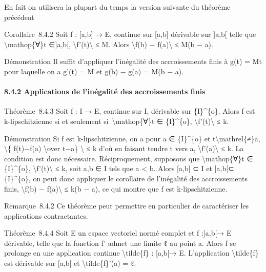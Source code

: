 \documentclass[]{article}
\begin{document}
En fait on utilisera la plupart du temps la version suivante du théorème
précédent

Corollaire~8.4.2 Soit f : {[}a,b{]} → E, continue sur {[}a,b{]}
dérivable sur {]}a,b{[} telle que \textbackslash{}mathop\{∀\}t
∈{]}a,b{[}, \textbackslash{}\textbar{}f'(t)\textbackslash{}\textbar{} ≤
M. Alors \textbackslash{}\textbar{}f(b) − f(a)\textbackslash{}\textbar{}
≤ M(b − a).

Démonstration Il suffit d'appliquer l'inégalité des accroissements finis
à g(t) = Mt pour laquelle on a g'(t) = M et g(b) − g(a) = M(b − a).

\paragraph{8.4.2 Applications de l'inégalité des accroissements finis}

Théorème~8.4.3 Soit f : I → E, continue sur I, dérivable sur
\{I\}\^{}\{o\}. Alors f est k-lipschitzienne si et seulement
si~\textbackslash{}mathop\{∀\}t ∈ \{I\}\^{}\{o\},
\textbackslash{}\textbar{}f'(t)\textbackslash{}\textbar{} ≤ k.

Démonstration Si f est k-lipschitzienne, on a pour a ∈ \{I\}\^{}\{o\} et
t\textbackslash{}mathrel\{≠\}a, \textbackslash{}\textbar{}\{ f(t)−f(a)
\textbackslash{}over t−a\} \textbackslash{}\textbar{} ≤ k d'où en
faisant tendre t vers a,
\textbackslash{}\textbar{}f'(a)\textbackslash{}\textbar{} ≤ k. La
condition est donc nécessaire. Réciproquement, supposons que
\textbackslash{}mathop\{∀\}t ∈ \{I\}\^{}\{o\},
\textbackslash{}\textbar{}f'(t)\textbackslash{}\textbar{} ≤ k, soit a,b
∈ I tels que a \textless{} b. Alors {[}a,b{]} ⊂ I et {]}a,b{[}⊂
\{I\}\^{}\{o\}, on peut donc appliquer le corollaire de l'inégalité des
accroissements finis, \textbackslash{}\textbar{}f(b) −
f(a)\textbackslash{}\textbar{} ≤ k(b − a), ce qui montre que f est
k-lipschitzienne.

Remarque~8.4.2 Ce théorème peut permettre en particulier de caractériser
les applications contractantes.

Théorème~8.4.4 Soit E un espace vectoriel normé complet et f :{]}a,b{[}→
E dérivable, telle que la fonction f' admet une limite ℓ au point a.
Alors f se prolonge en une application continue
\textbackslash{}tilde\{f\} : {[}a,b{[}→ E. L'application
\textbackslash{}tilde\{f\} est dérivable sur {[}a,b{[} et
\textbackslash{}tilde\{f\}'(a) = ℓ.
\end{document}
